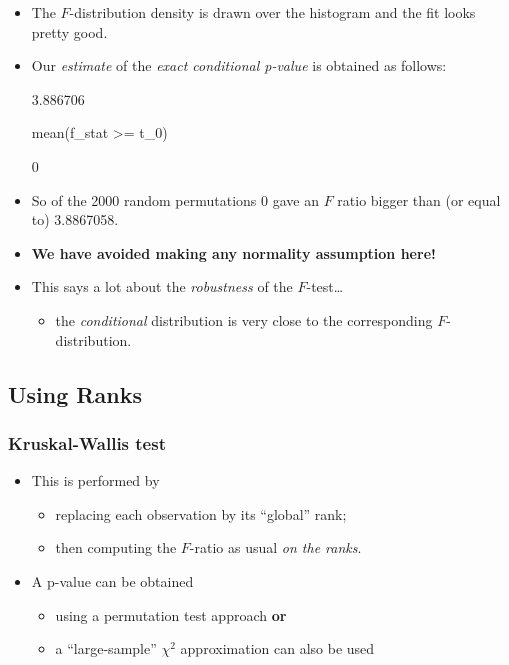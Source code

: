 \documentclass[a4paper]{article}
\begin{document}
\begin{itemize}
\begin{Schunk}
\end{Schunk}
	\item The \( F \)-distribution density is drawn over the histogram and the fit looks pretty good.
	\item Our \textit{estimate} of the \textit{exact conditional p-value} is obtained as follows:
\begin{Schunk}
\begin{Soutput}
[1] 3.886706
\end{Soutput}
\begin{Sinput}
mean(f_stat >= t_0)
\end{Sinput}
\begin{Soutput}
[1] 0
\end{Soutput}
\end{Schunk}
	\item So of the 2000 random permutations 0 gave an \( F \) ratio bigger than (or equal to) 3.8867058.
	\item \textbf{We have avoided making any normality assumption here!}
	\item This says a lot about the \textit{robustness} of the \( F \)-test\dots
	\begin{itemize}
		\item the \textit{conditional} distribution is very close to the corresponding \( F \)-distribution.
	\end{itemize}
\end{itemize}
\subsection{Using Ranks}
\subsubsection{Kruskal-Wallis test}
\begin{itemize}
	\item This is performed by
	\begin{itemize}
		\item replacing each observation by its ``global'' rank;
		\item then computing the \( F \)-ratio as usual \textit{on the ranks}.
	\end{itemize}
	\item A p-value can be obtained
	\begin{itemize}
		\item using a permutation test approach \textbf{or}
		\item a ``large-sample'' \( \chi^2 \) approximation can also be used
	\end{itemize}
\end{itemize}
\end{document}
